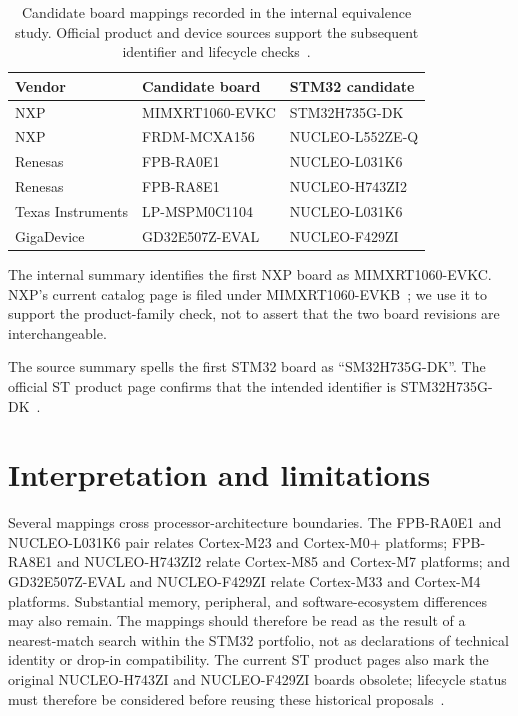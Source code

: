 \begin{table}[H]
\centering
\caption{Candidate board mappings recorded in the internal equivalence study. Official product and device sources support the subsequent identifier and lifecycle checks~\cite{nxp-imxrt1060-evk,st-stm32h735g-dk,nxp-frdm-mcxa156,st-nucleo-l552ze-q,renesas-fpb-ra0e1,st-nucleo-l031k6,renesas-fpb-ra8e1,st-nucleo-h743zi2,ti-lp-mspm0c1104,gd32e507-ds,st-nucleo-f429zi}.}
\label{tab:cascade-board-mappings}
\begin{tabular}{lll}
\toprule
Vendor & Candidate board & STM32 candidate \\
\midrule
NXP & MIMXRT1060-EVKC & STM32H735G-DK \\
NXP & FRDM-MCXA156 & NUCLEO-L552ZE-Q \\
Renesas & FPB-RA0E1 & NUCLEO-L031K6 \\
Renesas & FPB-RA8E1 & NUCLEO-H743ZI2 \\
Texas Instruments & LP-MSPM0C1104 & NUCLEO-L031K6 \\
GigaDevice & GD32E507Z-EVAL & NUCLEO-F429ZI \\
\bottomrule
\end{tabular}
\end{table}

The internal summary identifies the first NXP board as MIMXRT1060-EVKC. NXP's current
catalog page is filed under MIMXRT1060-EVKB~\cite{nxp-imxrt1060-evk}; we use it to support
the product-family check, not to assert that the two board revisions are interchangeable.

The source summary spells the first STM32 board as ``SM32H735G-DK''. The official ST
product page confirms that the intended identifier is STM32H735G-DK~\cite{st-stm32h735g-dk}.

\section{Interpretation and limitations}
\label{sec:cascade-equivalence-caveats}

Several mappings cross processor-architecture boundaries. The FPB-RA0E1 and
NUCLEO-L031K6 pair relates Cortex-M23 and Cortex-M0+ platforms; FPB-RA8E1 and
NUCLEO-H743ZI2 relate Cortex-M85 and Cortex-M7 platforms; and GD32E507Z-EVAL and
NUCLEO-F429ZI relate Cortex-M33 and Cortex-M4 platforms. Substantial memory, peripheral,
and software-ecosystem differences may also remain. The mappings should therefore be read
as the result of a nearest-match search within the STM32 portfolio, not as declarations of
technical identity or drop-in compatibility. The current ST product pages also mark the
original NUCLEO-H743ZI and NUCLEO-F429ZI boards obsolete; lifecycle status must therefore
be considered before reusing these historical proposals~\cite{st-nucleo-h743zi2,st-nucleo-f429zi}.

